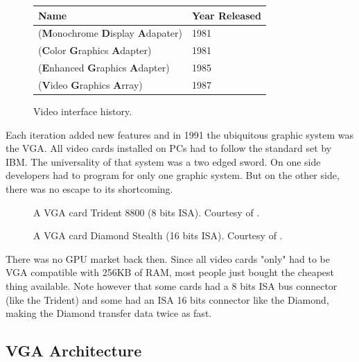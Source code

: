\documentclass[book.tex]{subfiles}
\begin{document}
 \begin{figure}[H]
\centering  
\begin{tabularx}{\textwidth}{ X  Y }
  \toprule
  \textbf{Name} &  \textbf{Year Released} \\
  \toprule {}
   (\textbf{M}onochrome
   \textbf{D}isplay
   \textbf{A}dapater) & 1981 
   \\ 
   (\textbf{C}olor
   \textbf{G}raphics
   \textbf{A}dapter) & 1981 
    \\ 
   (\textbf{E}nhanced
   \textbf{G}raphics
   \textbf{A}dapter) & 1985
   \\ 
   (\textbf{V}ideo
   \textbf{G}raphics
   \textbf{A}rray)  & 1987
    \\
  \toprule
\end{tabularx}
\caption{Video interface history.}\label{fig:vga_history}
\end{figure}

Each iteration added new features and in 1991 the ubiquitous graphic system was the VGA. All video cards installed on PCs had to follow the standard set by IBM. The universality of that system was a two edged sword. On one side developers had to program for only one graphic system. But on the other side, there was no escape to its shortcoming.\\

\begin{figure}[H] 
  \centering 
  \caption{A VGA card Trident 8800 (8 bits ISA). Courtesy of .}
\end{figure}
\par
\begin{figure}[H] 
  \centering 
  \caption{A VGA card Diamond Stealth (16 bits ISA). Courtesy of .}
\end{figure}
 There was no GPU market back then. Since all video cards "only" had to be VGA compatible with 256KB of RAM, most people just bought the cheapest thing available. Note however that some cards had a 8 bits ISA bus connector (like the Trident) and some had an ISA 16 bits connector like the Diamond, making the Diamond transfer data twice as fast.\\
\par




\subsection{VGA Architecture}
\end{document}
